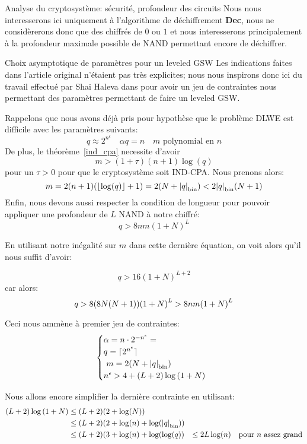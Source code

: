 \begin{section}{Analyse du cryptosystème: sécurité, profondeur des circuits}
	Nous nous interesserons ici uniquement à l'algorithme de déchiffrement
	\textbf{Dec}, nous ne considèrerons donc que des chiffrés de $0$ ou
	$1$ et nous interesserons principalement à la profondeur maximale 
	possible de NAND permettant encore de déchiffrer.

	\begin{subsection}{Choix asymptotique de paramètres pour un leveled GSW}
	\label{param_leveled}
	Les indications faites dans l'article original \cite{EPRINT:GenSahWat13} n'étaient pas très explicites; nous nous inspirons donc ici du travail
	effectué par Shai Haleva dans \cite{halevi} pour avoir un jeu de
	contraintes nous permettant des paramètres permettant de faire un
	leveled GSW. 

	Rappelons que nous avons déjà pris pour hypothèse que le problème DLWE est difficile avec les paramètres suivants:
	\[ q \approx 2^{n^\epsilon}\quad \alpha q = n\quad \text{$m$ polynomial en $n$}\]
	De plus, le théorème~\ref{ind_cpa} necessite d'avoir 
	\[m > (1+\tau)(n+1)\log(q) \]
	pour un $\tau > 0$ pour que le cryptosystème soit IND-CPA.  Nous prenons alors: 
	\[ m = 2(n+1)(\lfloor \log(q) \rfloor + 1) = 2(N + {|q|}_{\text{bin}}) < 2
	{|q|}_{\text{bin}} (N+1)\]
	Enfin, nous devons aussi respecter la condition de longueur pour pouvoir appliquer une profondeur de $L$ NAND à notre chiffré:
	\[q > 8nm (1 + N)^L \]

En utilisant notre inégalité sur $m$  dans cette dernière équation, on voit alors qu'il nous suffit d'avoir:

\begin{equation}
q > 16 {(1+N)}^{L+2}
\end{equation}
car alors:
\begin{equation}
q> 8 (8 N (N+1)) {(1 + N)}^{L} > 8 nm {(1 + N)}^L \\
\end{equation}

Ceci nous ammène à premier jeu de contraintes: 
\[ \begin{cases}\alpha  = n \cdot 2^{-n^\epsilon}=  \\
	q = \lceil 2^{n^\epsilon}\rceil\\ 
	m = 2(N + \bnorm{q}) \\  
	n^\epsilon > 4 + (L+2) \log\left( 1 + N\right)
	\end{cases} \]

Nous allons encore simplifier la dernière contrainte en utilisant:
\begin{align*} (L+2) \log\left( 1 + N\right) &\leq (L+2) (2 + \log(N)) \\
&\leq (L+2) (2 + \log(n) +  \log({|q|}_{\text{bin}})) \\
&\leq (L+2) (3 + \log(n) + \log(\log(q))
&\leq 2 L \log(n) \quad \text{pour $n$ assez grand}
\end{align*}


\end{subsection}
\end{section}
